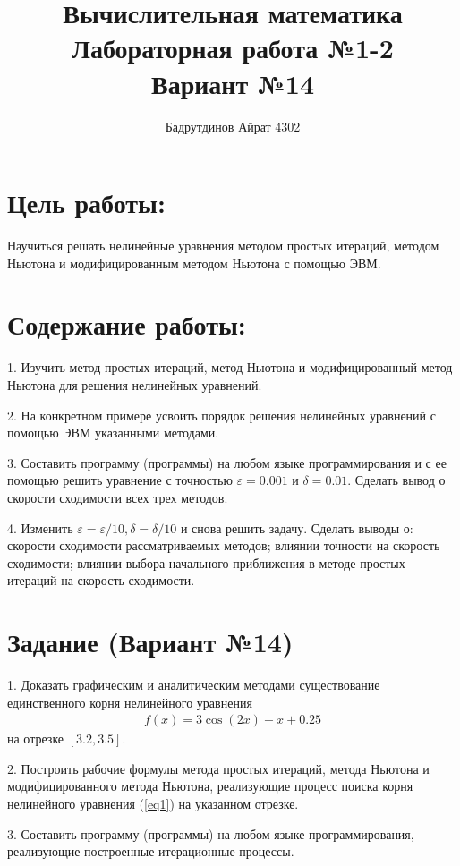 \documentclass[utf8x, 14pt, oneside, a4paper]{article}
\title{Вычислительная математика\\
	\large Лабораторная работа №1-2\\
	Вариант №14}
\author{Бадрутдинов Айрат 4302}
\begin{document}
\maketitle
\thispagestyle{empty}
\clearpage
\tableofcontents
\clearpage

\section{Цель работы:}
Научиться решать нелинейные уравнения методом простых итераций,
методом Ньютона и модифицированным методом Ньютона с помощью ЭВМ.

\section{Содержание работы:}

1. Изучить метод простых итераций, метод Ньютона и модифицированный метод
   Ньютона для решения нелинейных уравнений.

2. На конкретном примере усвоить порядок решения нелинейных уравнений с помощью
   ЭВМ указанными методами.

3. Составить программу (программы) на любом языке программирования и с ее
   помощью решить уравнение с точностью $\varepsilon = 0.001$ и 
   $\delta = 0.01$. Сделать вывод о скорости сходимости всех трех методов.

4. Изменить $\varepsilon = \varepsilon / 10, \delta = \delta / 10$ и снова
   решить задачу. Сделать выводы о: скорости сходимости рассматриваемых
   методов; влиянии точности на скорость сходимости; влиянии выбора начального
   приближения в методе простых итераций на скорость сходимости.

\section{Задание (Вариант №14)}

1. Доказать графическим и аналитическим методами существование единственного
   корня нелинейного уравнения
   \begin{align}\label{eq1}
   f(x) = 3 \cos(2x) - x + 0.25
   \end{align}
   на отрезке $[3.2, 3.5]$.

2. Построить рабочие формулы метода простых итераций, метода Ньютона и
   модифицированного метода Ньютона, реализующие процесс поиска корня
   нелинейного уравнения (\ref{eq1}) на указанном отрезке.

3. Составить программу (программы) на любом языке программирования, реализующие
   построенные итерационные процессы.
\end{document}
